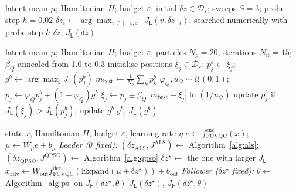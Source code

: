 \documentclass[conference]{IEEEtran}
\begin{document}
\begin{algorithm}[t]
\caption{ALS leader search (local)}\label{alg:als}
\small
\begin{algorithmic}[1]
\Require latent mean $\mu$; Hamiltonian $H$; budget $\varepsilon$; initial $\delta z\in\mathcal D_\varepsilon$; sweeps $S=3$; probe step $h=0.02$
    \State $\delta z_i\gets\arg\max_{v\in[-\varepsilon,\varepsilon]}J_{\mathsf L}(v,\delta z_{-i})$, searched numerically with probe step $h$ 
  \EndFor
\EndFor
\State \Return $\delta z$, $J_{\mathsf L}(\delta z)$
\end{algorithmic}
\end{algorithm}

\begin{algorithm}[t]
\caption{QPSO leader search (global, derivative-free)}\label{alg:qpso}
\small
\begin{algorithmic}[1]
\Require latent mean $\mu$; Hamiltonian $H$; budget $\varepsilon$; particles $N_p=20$; iterations $N_{\mathrm{it}}=15$; $\beta_Q$ annealed from 1.0 to 0.3
\State initialise positions $\xi_j\in\mathcal D_\varepsilon$; $p^b_j\gets\xi_j$; $g^b\gets\arg\max_j J_{\mathsf L}(p^b_j)$
  \State $m_{\mathrm{best}}\gets\frac1{N_p}\sum_k p^b_k$
   
    \State $\varphi_Q,u_Q\sim\mathcal U(0,1)$; $p_j\gets\varphi_Q p^b_j+(1-\varphi_Q)g^b$
    \State $\xi_j\gets p_j\pm\beta_Q\,|m_{\mathrm{best}}-\xi_j|\ln(1/u_Q)$ 
    \State update $p^b_j$ if $J_{\mathsf L}(\xi_j)>J_{\mathsf L}(p^b_j)$; update $g^b$
  \EndFor
\EndFor
\State \Return $g^b$, $J_{\mathsf L}(g^b)$
\end{algorithmic}
\end{algorithm}

\begin{algorithm}[t]
\caption{One epoch of the Study~B game}\label{alg:B}
\small
\begin{algorithmic}[1]
\Require state $x$, Hamiltonian $H$, budget $\varepsilon$, learning rate $\eta$
\State $e\gets f^{\mathrm{enc}}_{\mathrm{FCVQC}}(x)$; $\mu\gets W_\mu e+b_\mu$
\State \textit{Leader ($\theta$ fixed):} $(\delta z_{\mathrm{ALS}},J^{\mathrm{ALS}})\gets$ Algorithm~\ref{alg:als}; $(\delta z_{\mathrm{QPSO}},J^{\mathrm{QPSO}})\gets$ Algorithm~\ref{alg:qpso}
\State $\delta z^\star\gets$ the one with larger $J_{\mathsf L}$
\State $\hat x_{\mathrm{adv}}\gets W_{\mathrm{out}}f^{\mathrm{dec}}_{\mathrm{FCVQC}}(\mathrm{Expand}(\mu+\delta z^\star))+b_{\mathrm{out}}$
\State \textit{Follower ($\delta z^\star$ fixed):} $\theta\gets$ Algorithm~\ref{alg:ps} on $J_{\mathsf F}(\delta z^\star,\theta)$
\State \Return $J_{\mathsf L}(\delta z^\star)$, $J_{\mathsf F}(\delta z^\star,\theta)$
\end{algorithmic}
\end{algorithm}
\end{document}
